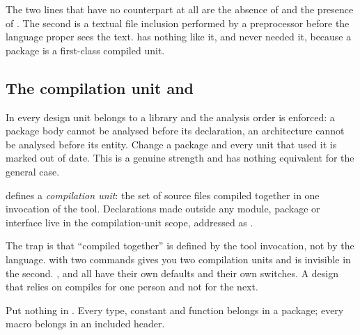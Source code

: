The two lines that have no \VHDL{} counterpart at all are the absence of
 and the presence of . The second is a textual
file inclusion performed by a preprocessor before the language proper sees the
text. \VHDL{} has nothing like it, and never needed it, because a package is a
first-class compiled unit.

\subsection{The compilation unit and }

In \VHDL{} every design unit belongs to a library and the analysis order is
enforced: a package body cannot be analysed before its declaration, an
architecture cannot be analysed before its entity. Change a package and every
unit that used it is marked out of date. This is a genuine strength and \SV{}
has nothing equivalent for the general case.

\SV{} defines a \emph{compilation unit}: the set of
source files compiled together in one invocation of the tool. Declarations
made outside any module, package or interface live in the compilation-unit
scope, addressed as .


The trap is that ``compiled together'' is defined by the tool invocation, not by
the language.  with two  commands gives you two
compilation units and  is invisible in the second.
,  and  all have their own defaults and
their own switches. A design that relies on  compiles for one
person and not for the next.

\begin{ruleofthumb}
Put nothing in . Every type, constant and function belongs in a
package; every macro belongs in an included header.
\end{ruleofthumb}


